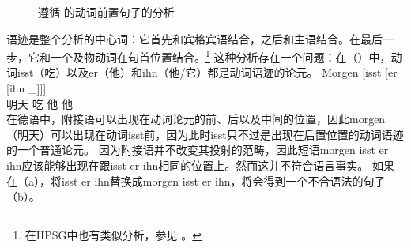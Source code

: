 \begin{figure}
\caption{\label{Abbildung-CG-isst-der-junge-den-kuchen-jacobs}遵循 \citet{Jacobs91a}的动词前置句子的分析}
\end{figure}%
语迹是整个分析的中心词：它首先和宾格宾语结合，之后和主语结合。在最后一步，它和一个及物动词在句首位置结合。\footnote{在HPSG\indexhpsgc 中也有类似分析，参见 。
} 
这种分析存在一个问题：在（）中，动词isst（吃）以及er（他）和ihn（他/它）都是动词语迹的论元。
\ea
\gll Morgen [isst [er [ihn \_]]]\\
     明天 \spacebr{}吃 \spacebr{}他 \spacebr{}他\\
\z
在德语中，附接语可以出现在动词论元的前、后以及中间的位置，因此morgen（明天）可以出现在动词isst前，因为此时isst只不过是出现在后置位置的动词语迹的一个普通论元。
因为附接语并不改变其投射的范畴，因此短语morgen isst er ihn应该能够出现在跟isst er ihn相同的位置上。然而这并不符合语言事实。
如果在（a），将isst er ihn替换成morgen isst er ihn，将会得到一个不合语法的句子（b）。
\eal
{}
